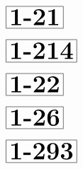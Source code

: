 \documentclass[a4paper, 10pt]{article}
\begin{document}
\begin{minipage}[t]{0.15\textwidth}
                \vspace*{-1.59cm}
        \hspace*{0.75cm}
        $\boxed{\textbf{\Huge1-21}}$
\end{minipage}
\begin{minipage}[t]{0.85\textwidth}
    
\end{minipage}

\begin{minipage}[t]{0.15\textwidth}
                \vspace*{-1.59cm}
        \hspace*{0.25cm}
        $\boxed{\textbf{\Huge1-214}}$
\end{minipage}
\begin{minipage}[t]{0.85\textwidth}
    
\end{minipage}

\begin{minipage}[t]{0.15\textwidth}
                \vspace*{-1.59cm}
        \hspace*{0.75cm}
        $\boxed{\textbf{\Huge1-22}}$
\end{minipage}
\begin{minipage}[t]{0.85\textwidth}
    
\end{minipage}

\begin{minipage}[t]{0.15\textwidth}
                \vspace*{-1.59cm}
        \hspace*{0.75cm}
        $\boxed{\textbf{\Huge1-26}}$
\end{minipage}
\begin{minipage}[t]{0.85\textwidth}
    
\end{minipage}

\thispagestyle{empty}
\begin{minipage}[t]{0.15\textwidth}
                \vspace*{-1.59cm}
        \hspace*{0.25cm}
        $\boxed{\textbf{\Huge1-293}}$
\end{minipage}
\begin{minipage}[t]{0.85\textwidth}
    
\end{minipage}
\end{document}
